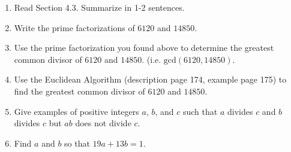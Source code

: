 \documentclass[12pt]{article}
\begin{document}
\begin{enumerate}
\item Read Section 4.3. Summarize in 1-2 sentences.
\vfill
\item Write the prime factorizations of $6120$ and $14850.$\\
\vfill
\item Use the prime factorization you found above to determine the greatest common divisor of $6120$ and $14850.$ (i.e. $\text{gcd}(6120,14850).$
\vfill
\item Use the Euclidean Algorithm (description page 174, example page 175) to find the greatest common divisor of $6120$ and $14850.$ 
\vfill
\item Give examples of positive integers $a$, $b$, and $c$ such that $a$ divides $c$ and $b$ divides $c$ but $ab$ does not divide $c$.
\vfill
\item Find $a$ and $b$ so that $19a+13b=1.$\\
\vfill
\end{enumerate}
\end{document}
